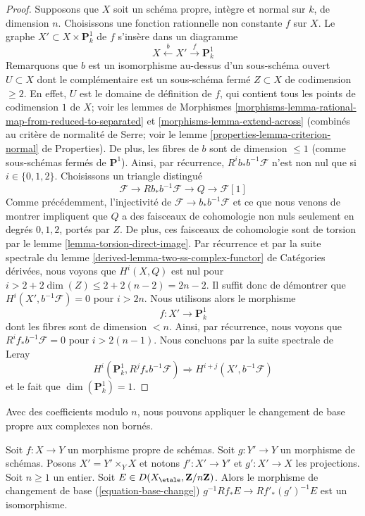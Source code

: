 \begin{proof}
\medskip\noindent
Supposons que $X$ soit un schéma propre, intègre et normal sur $k$, de dimension $n$.
Choisissons une fonction rationnelle non constante $f$ sur $X$. Le graphe
$X' \subset X \times \mathbf{P}^1_k$ de $f$ s'insère dans un diagramme
$$
X \xleftarrow{b} X' \xrightarrow{f} \mathbf{P}^1_k
$$
Remarquons que $b$ est un isomorphisme au-dessus d'un sous-schéma ouvert
$U \subset X$ dont le complémentaire est un sous-schéma fermé
$Z \subset X$ de codimension $\geq 2$. En effet, $U$ est le
domaine de définition de $f$, qui contient tous les points de codimension $1$
de $X$; voir les lemmes de Morphismes
\ref{morphisms-lemma-rational-map-from-reduced-to-separated}
et \ref{morphisms-lemma-extend-across}
(combinés au critère de normalité de Serre; voir le
lemme \ref{properties-lemma-criterion-normal} de Properties).
De plus, les fibres de $b$ sont de dimension $\leq 1$ (comme sous-schémas fermés
de $\mathbf{P}^1$). Ainsi, par récurrence, $R^ib_*b^{-1}\mathcal{F}$ n'est non nul que
si $i \in \{0, 1, 2\}$. Choisissons un triangle distingué
$$
\mathcal{F} \to Rb_*b^{-1}\mathcal{F} \to Q \to \mathcal{F}[1]
$$
Comme précédemment, l'injectivité de $\mathcal{F} \to b_*b^{-1}\mathcal{F}$
et ce que nous venons de montrer impliquent que $Q$ a des
faisceaux de cohomologie non nuls seulement en degrés $0, 1, 2$, portés par $Z$.
De plus, ces faisceaux de cohomologie sont de torsion par le
lemme \ref{lemma-torsion-direct-image}.
Par récurrence et par la suite spectrale du
lemme \ref{derived-lemma-two-ss-complex-functor} de Catégories dérivées,
nous voyons que $H^i(X, Q)$ est nul pour
$i > 2 + 2\dim(Z) \leq 2 + 2(n - 2) = 2n - 2$. Il suffit donc
de démontrer que $H^i(X', b^{-1}\mathcal{F}) = 0$ pour
$i > 2n$. Nous utilisons alors le morphisme
$$
f : X' \to \mathbf{P}^1_k
$$
dont les fibres sont de dimension $< n$. Ainsi, par récurrence, nous voyons que
$R^if_*b^{-1}\mathcal{F} = 0$ pour $i > 2(n - 1)$.
Nous concluons par la suite spectrale de Leray
$$
H^i(\mathbf{P}^1_k, R^jf_*b^{-1}\mathcal{F})
\Rightarrow
H^{i + j}(X', b^{-1}\mathcal{F})
$$
et le fait que $\dim(\mathbf{P}^1_k) = 1$.
\end{proof}

\noindent
Avec des coefficients modulo $n$, nous pouvons appliquer le changement
de base propre aux complexes non bornés.

\begin{lemma}
\label{lemma-proper-base-change-mod-n}
Soit $f : X \to Y$ un morphisme propre de schémas. Soit $g : Y' \to Y$
un morphisme de schémas. Posons $X' = Y' \times_Y X$ et notons
$f' : X' \to Y'$ et $g' : X' \to X$ les projections.
Soit $n \geq 1$ un entier.
Soit $E \in D(X_\etale, \mathbf{Z}/n\mathbf{Z})$.
Alors le morphisme de changement de base (\ref{equation-base-change})
$g^{-1}Rf_*E \to Rf'_*(g')^{-1}E$
est un isomorphisme.
\end{lemma}

